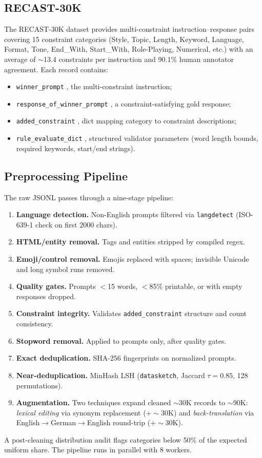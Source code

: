 \documentclass[10pt]{article}
\begin{document}
\subsection{RECAST-30K}
The RECAST-30K dataset provides multi-constraint instruction--response
pairs covering 15 constraint categories (Style, Topic, Length, Keyword, Language, Format, Tone, End\_With, Start\_With, Role-Playing, Numerical,
etc.) with an average of $\sim$13.4 constraints per instruction and 90.1\%
human annotator agreement. Each record contains:
\begin{itemize}
  \item \texttt{winner\_prompt} ,  the multi-constraint instruction;
  \item \texttt{response\_of\_winner\_prompt} ,  a constraint-satisfying
        gold response;
  \item \texttt{added\_constraint} ,  dict mapping category to
        constraint descriptions;
  \item \texttt{rule\_evaluate\_dict} ,  structured validator parameters
        (word length bounds, required keywords, start/end strings).
\end{itemize}

\subsection{Preprocessing Pipeline}
The raw JSONL passes through a nine-stage pipeline:
\begin{enumerate}[label=\arabic*.]
  \item \textbf{Language detection.} Non-English prompts filtered via
        \texttt{langdetect} (ISO-639-1 check on first 2000 chars).
  \item \textbf{HTML/entity removal.} Tags and entities stripped by
        compiled regex.
  \item \textbf{Emoji/control removal.} Emojis replaced with spaces;
        invisible Unicode and long symbol runs removed.
  \item \textbf{Quality gates.} Prompts $<$15 words, $<$85\% printable,
        or with empty responses dropped.
  \item \textbf{Constraint integrity.} Validates \texttt{added\_constraint}
        structure and count consistency.
  \item \textbf{Stopword removal.} Applied to prompts only, after quality
        gates.
  \item \textbf{Exact deduplication.} SHA-256 fingerprints on normalized
        prompts.
  \item \textbf{Near-deduplication.} MinHash LSH (\texttt{datasketch},
        Jaccard $\tau{=}0.85$, 128 permutations).
  \item \textbf{Augmentation.} Two techniques expand cleaned $\sim$30K
        records to $\sim$90K: \textit{lexical editing} via synonym
        replacement ($+{\sim}30$K) and \textit{back-translation} via
        \\English$\to$German$\to$English round-trip ($+{\sim}30$K).
\end{enumerate}
A post-cleaning distribution audit flags categories below 50\% of the
expected uniform share. The pipeline runs in parallel with 8 workers.
\end{document}
